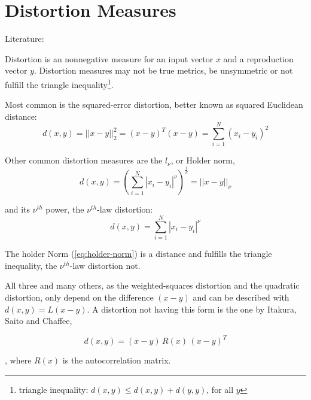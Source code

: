 \section{Distortion Measures}\label{sec:lvq-distortion-measures}
Literature: \cite{Linde1980}

Distortion is an nonnegative measure for an input vector $x$ and a reproduction vector $y$. Distortion measures may not be true metrics, \eg be unsymmetric or not fulfill the triangle inequality\footnote{triangle inequality: $d(x, y) \leq d(x, y) + d(y, y)$, for all $y$}.

Most common is the squared-error distortion, better known as squared Euclidean distance:
\begin{equation}
d(x, y) = ||x-y||_2^2 = (x-y)^T (x-y) = \sum_{i=1}^N (x_i-y_i)^2
\end{equation}

Other common distortion measures are the $l_\nu$, or Holder norm,
\begin{equation}\label{eq:holder-norm}
d(x, y) = \left( \sum_{i=1}^N |x_i - y_i|^\nu \right) ^{\frac{1}{\nu}} = || x - y ||_\nu
\end{equation}

and its $\nu^{th}$ power, the $\nu^{th}$-law distortion:
\begin{equation}
d(x, y) = \sum_{i=1}^N |x_i - y_i|^\nu
\end{equation}

The holder Norm (\ref{eq:holder-norm}) is a distance and fulfills the triangle inequality, the $\nu^{th}$-law distortion not.

All three and many others, as the weighted-squares distortion and the quadratic distortion, only depend on the difference $(x - y)$ and can be described with $d(x, y) = L(x - y)$. A distortion not having this form is the one by Itakura, Saito and Chaffee,

\begin{equation}
d(x, y) = (x - y)\, R(x)\, (x - y)^T
\end{equation}

, where $R(x)$ is the autocorrelation matrix.
